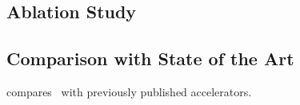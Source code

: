 \subsection{Ablation Study}

\subsection{Comparison with State of the Art}
\label{sec:eval:sota}
 compares \sysname\ with previously published accelerators.

\begin{table}[t]
  \centering
  \caption{Comparison with state-of-the-art SLAM/VIO accelerators.}
  \label{tab:sota}
  
\end{table}
